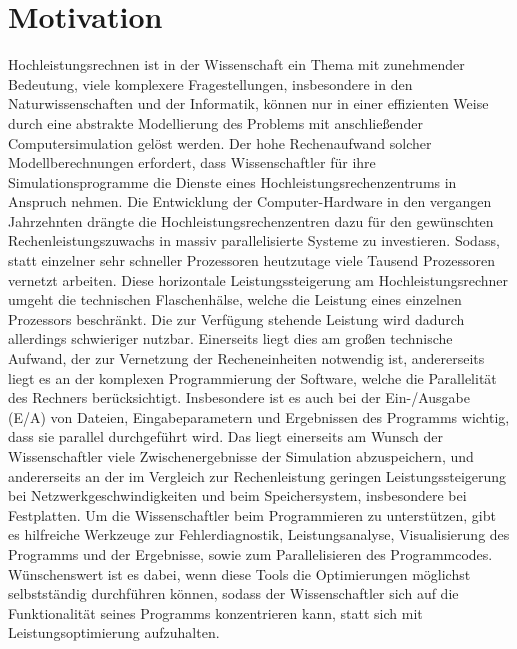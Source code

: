 \documentclass[
	12pt,
	a4paper,
	BCOR10mm,
	DIV14,
	listof=totoc,
	bibliography=totoc,
	headsepline
]{scrreprt}
\begin{document}
\section{Motivation}

Hochleistungsrechnen ist in der Wissenschaft ein Thema mit zunehmender Bedeutung, viele komplexere Fragestellungen, insbesondere in den Naturwissenschaften und der Informatik, können nur in einer effizienten Weise durch eine abstrakte Modellierung des Problems mit anschließender Computersimulation gelöst werden. Der hohe Rechenaufwand solcher Modellberechnungen erfordert, dass Wissenschaftler für ihre Simulationsprogramme die Dienste eines Hochleistungsrechenzentrums in Anspruch nehmen. 
Die Entwicklung der Computer-Hardware in den vergangen Jahrzehnten drängte die Hochleistungsrechenzentren dazu für den gewünschten Rechenleistungszuwachs in massiv parallelisierte Systeme zu investieren. Sodass, statt einzelner sehr schneller Prozessoren heutzutage viele Tausend Prozessoren vernetzt arbeiten. Diese horizontale Leistungssteigerung am Hochleistungsrechner umgeht die technischen Flaschenhälse, welche die Leistung eines einzelnen Prozessors beschränkt.
Die zur Verfügung stehende Leistung wird dadurch allerdings schwieriger nutzbar. 
Einerseits liegt dies am großen  technische Aufwand, der zur Vernetzung der Recheneinheiten notwendig ist, andererseits liegt es an der komplexen Programmierung der Software, welche die Parallelität des Rechners berücksichtigt. Insbesondere ist es auch bei der Ein-/Ausgabe (E/A) von Dateien, Eingabeparametern und Ergebnissen des Programms wichtig, dass sie parallel durchgeführt wird. Das liegt einerseits am Wunsch der Wissenschaftler viele Zwischenergebnisse der Simulation abzuspeichern, und andererseits an der im Vergleich zur Rechenleistung geringen Leistungssteigerung bei Netzwerkgeschwindigkeiten und beim Speichersystem, insbesondere bei Festplatten.
Um die Wissenschaftler beim Programmieren zu unterstützen, gibt es hilfreiche Werkzeuge zur Fehlerdiagnostik, Leistungsanalyse, Visualisierung des Programms und der Ergebnisse, sowie zum Parallelisieren des Programmcodes. Wünschenswert ist es dabei, wenn diese Tools die Optimierungen möglichst selbstständig durchführen können, sodass der Wissenschaftler sich auf die Funktionalität seines Programms konzentrieren kann, statt sich mit Leistungsoptimierung aufzuhalten.
\end{document}
